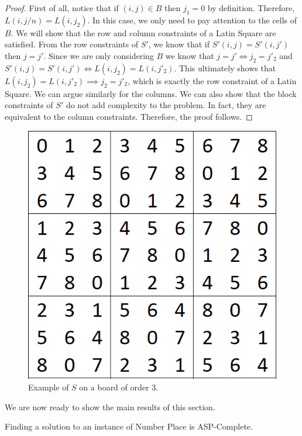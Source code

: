 \documentclass[runningheads,a4paper]{llncs}
\begin{document}
\begin{proof}

First of all, notice that if $(i, j) \in B$ then $j_1 = 0$ by definition. Therefore, $L(i, j/n) = L(i, j_2)$.
In this case, we only need to pay attention to the cells of $B$. We will show that the row and column constraints of a Latin Square are satisfied. From the row constraints of $S'$, we know that if $S'(i,j) = S'(i,j')$ then $j = j'$. Since we are only considering $B$ we know that $j = j' \iff j_2 = j'_2$ and $S'(i,j) = S'(i,j') \iff L(i, j_2) = L(i, j'_2)$. This ultimately shows that $L(i, j_2) = L(i, j'_2) \implies j_2 = j'_2$, which is exactly the row constraint of a Latin Square. We can argue similarly for the columns.
We can also show that the block constraints of $S'$ do not add complexity to the problem. In fact, they are equivalent to the column constraints. Therefore, the proof follows.

\end{proof}

\begin{figure}[H]
\label{fig:S_example}
\centering
\includegraphics[scale=0.25]{sudoku-4.png}
\caption{Example of $S$ on a board of order 3.}
\end{figure}

We are now ready to show the main results of this section.
\begin{theorem} Finding a solution to an instance of Number Place is ASP-Complete. \end{theorem}
\end{document}
